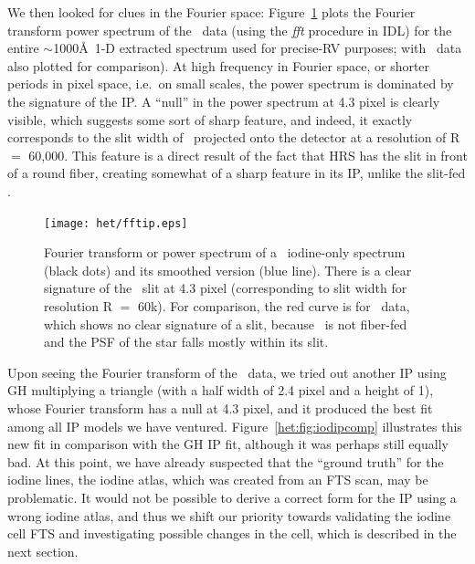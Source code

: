 We then looked for clues in the Fourier space:
Figure~\ref{het:fig:fftip} plots the Fourier transform power spectrum
of the \het\ data (using the {\it fft} procedure in IDL) for the
entire $\sim$1000\AA\ 1-D extracted spectrum used for precise-RV
purposes; with \keck\ data also plotted for comparison). At high
frequency in Fourier space, or shorter periods in pixel space, i.e.\
on small scales, the power spectrum is dominated by the signature of
the IP. A ``null'' in the power spectrum at 4.3 pixel is clearly
visible, which suggests some sort of sharp feature, and indeed, it
exactly corresponds to the slit width of \het\ projected onto the
detector at a resolution of R $=$ 60,000. This feature is a direct
result of the fact that HRS has the slit in front of a round fiber,
creating somewhat of a sharp feature in its IP, unlike the slit-fed
\keck.


\begin{figure}
\centering
\texttt{[image: het/fftip.eps]}
\caption{Fourier transform or power spectrum of a \het\ iodine-only
  spectrum (black dots) and its smoothed version (blue line). There is
  a clear signature of the \het\ slit at 4.3 pixel (corresponding to
  slit width for resolution R $=$ 60k). For comparison, the red curve
  is for \keck\ data, which shows no clear signature of a slit,
  because \keck\ is not fiber-fed and the PSF of the star falls mostly
  within its slit.
\label{het:fig:fftip}}
\end{figure}


Upon seeing the Fourier transform of the \het\ data, we tried out
another IP using GH multiplying a triangle (with a half width of 2.4
pixel and a height of 1), whose Fourier transform has a null at 4.3
pixel, and it produced the best fit among all IP models we have
ventured. Figure~\ref{het:fig:iodipcomp} illustrates this new fit in
comparison with the GH IP fit, although it was perhaps
still equally bad. At this point, we have already suspected that
the ``ground truth'' for the iodine lines, the iodine atlas, which was
created from an FTS scan, may be problematic. It would not be possible
to derive a correct form for the IP using a wrong iodine atlas, and
thus we shift our priority towards validating the iodine cell FTS and
investigating possible changes in the cell, which is described in the
next section.


